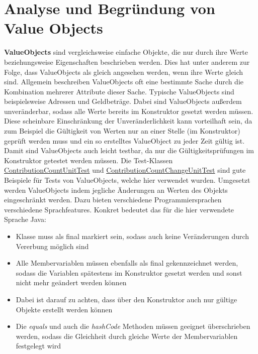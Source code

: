 \newpage

\section{Analyse und Begründung von Value Objects}

\textbf{ValueObjects} sind vergleichsweise einfache Objekte, die nur durch ihre Werte beziehungsweise Eigenschaften beschrieben werden.
Dies hat unter anderem zur Folge, dass ValueObjects als gleich angesehen werden, wenn ihre Werte gleich sind.
Allgemein beschreiben ValueObjects oft eine bestimmte Sache durch die Kombination mehrerer Attribute dieser Sache.
Typische ValueObjects sind beispielsweise Adressen und Geldbeträge.
Dabei sind ValueObjects außerdem unveränderbar, sodass alle Werte bereits im Konstruktor gesetzt werden müssen.
Diese scheinbare Einschränkung der Unveränderlichkeit kann vorteilhaft sein, da zum Beispiel die Gültigkeit von Werten nur an einer Stelle (im Konstruktor) geprüft werden muss und ein so erstelltes ValueObject zu jeder Zeit gültig ist.
Damit sind ValueObjects auch leicht testbar, da nur die Gültigkeitsprüfungen im Konstruktor getestet werden müssen. 
Die Test-Klassen \href{https://github.com/lukaspanni/OpenSourceStats/blob/main/app/src/test/java/de/lukaspanni/opensourcestats/ContributionCountUnitTest.java}{ContributionCountUnitTest} und \href{https://github.com/lukaspanni/OpenSourceStats/blob/main/app/src/test/java/de/lukaspanni/opensourcestats/ContributionCountChangeUnitTest.java}{ContributionCountChangeUnitTest} sind gute Beispiele für Tests von ValueObjects, welche hier verwendet wurden.
\newline
Umgesetzt werden ValueObjects indem jegliche Änderungen an Werten des Objekts eingeschränkt werden.
Dazu bieten verschiedene Programmiersprachen verschiedene Sprachfeatures.
\newline
Konkret bedeutet das für die hier verwendete Sprache Java:
\begin{itemize}
\item{Klasse muss als final markiert sein, sodass auch keine Veränderungen durch Vererbung möglich sind}
\item{Alle Membervariablen müssen ebenfalls als final gekennzeichnet werden, sodass die Variablen spätestens im Konstruktor gesetzt werden und sonst nicht mehr geändert werden können}
\item{Dabei ist darauf zu achten, dass über den Konstruktor auch nur gültige Objekte erstellt werden können}
\item{Die \textit{equals} und auch die \textit{hashCode} Methoden müssen geeignet überschrieben werden, sodass die Gleichheit durch gleiche Werte der Membervariablen festgelegt wird}
\end{itemize}


